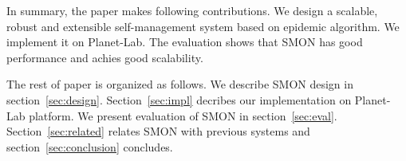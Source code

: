 

In summary, the paper makes following contributions.  We
design a scalable, robust and extensible self-management
system based on epidemic algorithm.  We implement it on
Planet-Lab. The evaluation shows that SMON has good
performance and achies good scalability.

The rest of paper is organized as follows. We describe SMON
design in section~\ref{sec:design}. Section~\ref{sec:impl}
decribes our implementation on Planet-Lab platform. We
present evaluation of SMON in section~\ref{sec:eval}.
Section~\ref{sec:related} relates SMON with previous systems
and section~\ref{sec:conclusion} concludes.


